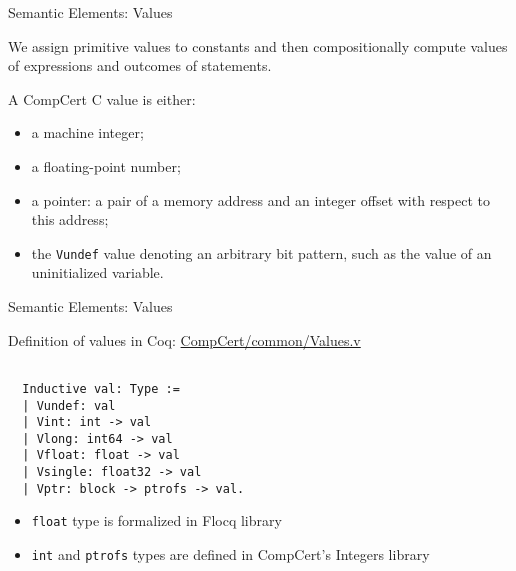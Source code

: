 \documentclass{beamer}
\begin{document}
    \begin{frame}{Semantic Elements: Values}
      
      We assign primitive values to constants and then compositionally compute values of expressions and outcomes of statements.

      \bigskip
      
      A CompCert C value is either:
      
    \begin{itemize}
    
\item a machine integer;
\item a floating-point number;
\item a pointer: a pair of a memory address and an integer offset with respect
  to this address;
\item the \texttt{Vundef} value denoting an arbitrary bit pattern, such as the
  value of an uninitialized variable.
 \end{itemize}
\end{frame}

\begin{frame}[t,fragile]{Semantic Elements: Values}

 Definition of values in Coq: \url{CompCert/common/Values.v}
  
 \begin{lstlisting}[language=Coq]
   
  Inductive val: Type :=
  | Vundef: val
  | Vint: int -> val
  | Vlong: int64 -> val
  | Vfloat: float -> val
  | Vsingle: float32 -> val
  | Vptr: block -> ptrofs -> val.
\end{lstlisting}



\begin{itemize}
\item \texttt{float} type is formalized in Flocq library
\item \texttt{int} and \texttt{ptrofs} types are defined in CompCert's Integers library
\end{itemize}
  
\end{frame}  











  
\end{document}

